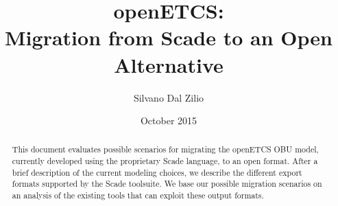 \documentclass{template/openetcs_report}
\begin{document}
\frontmatter
{}




\title{openETCS:\\ Migration from Scade to an Open Alternative}

\subtitle{}

\date{October 2015}


\techassessorname{}
\techassessoraffil{}

\qualityassessorname{}
\qualityassessoraffil{}

\approvalname{}
\approvalaffil{}


\author{Silvano Dal Zilio}

  




\begin{abstract}
  This document evaluates possible scenarios for migrating the
  openETCS OBU model, currently developed using the proprietary Scade
  language, to an open format. After a brief description of the
  current modeling choices, we describe the different export formats
  supported by the Scade toolsuite. We base our possible migration
  scenarios on an analysis of the existing tools that can exploit
  these output formats.
\end{abstract}
\end{document}
